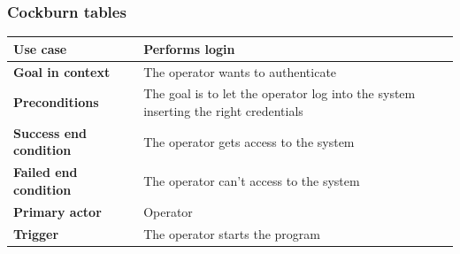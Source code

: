 {{		\subsubsection{Cockburn tables}{
			\begin{table}[ht]
			\begin{tabular}{|p{4cm}|p{10cm}|}
			\hline
				\centering \vspace{1mm} \bfseries{Use case} \vspace{1mm} & 
				\vspace{1mm} Performs login \vspace{1mm}\\
			\hline
				\centering \vspace{1mm} \bfseries{Goal in context} \vspace{1mm} & 
				\vspace{1mm} The operator wants to authenticate \vspace{1mm}\\
			\hline
				\centering \vspace{1mm} \bfseries{Preconditions} \vspace{1mm} & 
				\vspace{1mm} The goal is to let the operator log into the system inserting the right credentials \vspace{1mm}\\
			\hline
				\centering \vspace{1mm} \bfseries{Success end condition} \vspace{1mm} & 
				\vspace{1mm} The operator gets access to the system \vspace{1mm}\\
			\hline
				\centering \vspace{1mm} \bfseries{Failed end condition} \vspace{1mm} & 
				\vspace{1mm} The operator can't access to the system \vspace{1mm}\\
			\hline
				\centering \vspace{1mm} \bfseries{Primary actor} \vspace{1mm} & 
				\vspace{1mm} Operator \vspace{1mm}\\
			\hline
				\centering \vspace{1mm} \bfseries{Trigger} \vspace{1mm} & 
				\vspace{1mm} The operator starts the program \vspace{1mm}\\
			\hline
			\end{tabular}
			\end{table}

}}}
